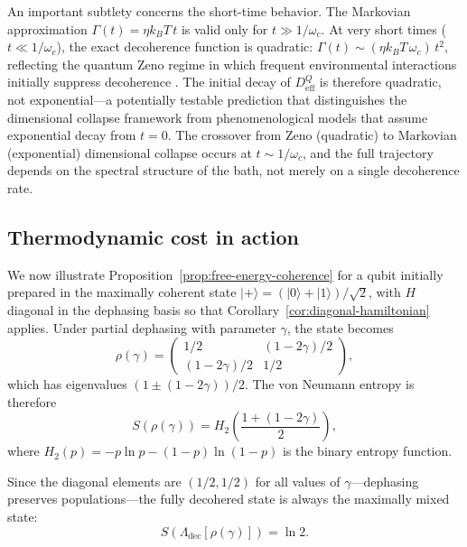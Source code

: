\documentclass[12pt,a4paper]{article}
\theoremstyle{definition}
\theoremstyle{remark}
\begin{document}
An important subtlety concerns the short-time behavior.  The Markovian approximation $\Gamma(t) = \eta k_BT\, t$ is valid only for $t \gg 1/\omega_c$.  At very short times ($t \ll 1/\omega_c$), the exact decoherence function is quadratic: $\Gamma(t) \sim (\eta k_BT\, \omega_c)\, t^2$, reflecting the quantum Zeno regime in which frequent environmental interactions initially suppress decoherence \cite{leggett1987dynamics}.  The initial decay of $D_{\mathrm{eff}}^Q$ is therefore quadratic, not exponential---a potentially testable prediction that distinguishes the dimensional collapse framework from phenomenological models that assume exponential decay from $t = 0$.  The crossover from Zeno (quadratic) to Markovian (exponential) dimensional collapse occurs at $t \sim 1/\omega_c$, and the full trajectory depends on the spectral structure of the bath, not merely on a single decoherence rate.

\subsection{Thermodynamic cost in action}
\label{sec:thermo-example}

We now illustrate Proposition~\ref{prop:free-energy-coherence} for a qubit initially prepared in the maximally coherent state $|{+}\rangle = (|0\rangle + |1\rangle)/\sqrt{2}$, with $H$ diagonal in the dephasing basis so that Corollary~\ref{cor:diagonal-hamiltonian} applies.  Under partial dephasing with parameter $\gamma$, the state becomes
\begin{equation}
\label{eq:dephased-plus}
\rho(\gamma) = \begin{pmatrix} 1/2 & (1-2\gamma)/2 \\ (1-2\gamma)/2 & 1/2 \end{pmatrix},
\end{equation}
which has eigenvalues $(1 \pm (1-2\gamma))/2$.  The von Neumann entropy is therefore
\begin{equation}
\label{eq:entropy-dephased}
S(\rho(\gamma)) = H_2\!\left(\frac{1 + (1-2\gamma)}{2}\right),
\end{equation}
where $H_2(p) = -p\ln p - (1-p)\ln(1-p)$ is the binary entropy function.

Since the diagonal elements are $(1/2, 1/2)$ for all values of $\gamma$---dephasing preserves populations---the fully decohered state is always the maximally mixed state:
\begin{equation}
\label{eq:decohered-entropy}
S(\Lambda_{\mathrm{dec}}[\rho(\gamma)]) = \ln 2.
\end{equation}
\end{document}
